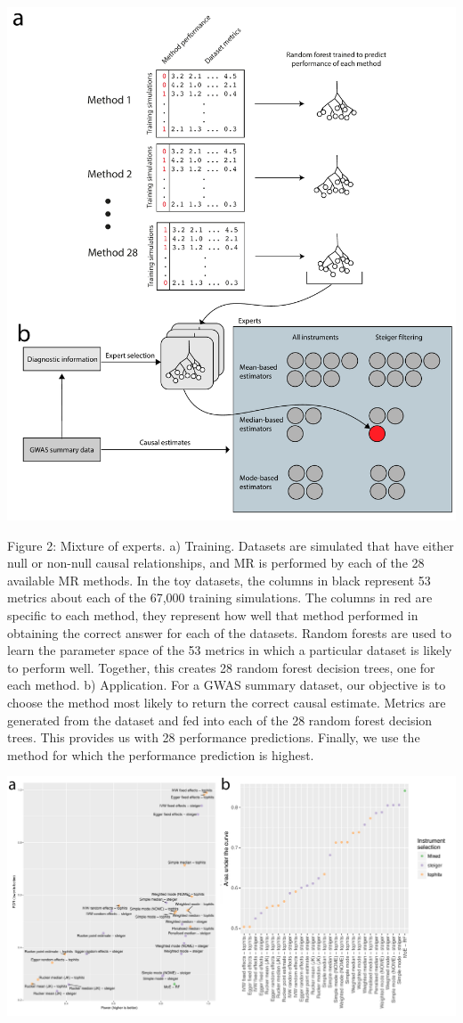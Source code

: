 \documentclass[]{article}
\begin{document}
\newpage

\includegraphics{images/fig2.pdf}

Figure 2: Mixture of experts. a) Training. Datasets are simulated that
have either null or non-null causal relationships, and MR is performed
by each of the 28 available MR methods. In the toy datasets, the columns
in black represent 53 metrics about each of the 67,000 training
simulations. The columns in red are specific to each method, they
represent how well that method performed in obtaining the correct answer
for each of the datasets. Random forests are used to learn the parameter
space of the 53 metrics in which a particular dataset is likely to
perform well. Together, this creates 28 random forest decision trees,
one for each method. b) Application. For a GWAS summary dataset, our
objective is to choose the method most likely to return the correct
causal estimate. Metrics are generated from the dataset and fed into
each of the 28 random forest decision trees. This provides us with 28
performance predictions. Finally, we use the method for which the
performance prediction is highest.

\newpage

\includegraphics{images/fig3.pdf}
\end{document}

